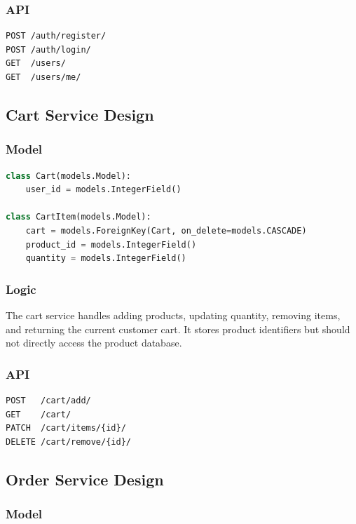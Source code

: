 \documentclass[12pt,a4paper]{article}
\begin{document}
\subsubsection{API}

\begin{lstlisting}[caption={User service API.}]
POST /auth/register/
POST /auth/login/
GET  /users/
GET  /users/me/
\end{lstlisting}

\subsection{Cart Service Design}

\subsubsection{Model}

\begin{lstlisting}[language=Python,caption={Cart service model.}]
class Cart(models.Model):
    user_id = models.IntegerField()

class CartItem(models.Model):
    cart = models.ForeignKey(Cart, on_delete=models.CASCADE)
    product_id = models.IntegerField()
    quantity = models.IntegerField()
\end{lstlisting}

\subsubsection{Logic}

The cart service handles adding products, updating quantity, removing items, and returning the current customer cart. It stores product identifiers but should not directly access the product database.

\subsubsection{API}

\begin{lstlisting}[caption={Cart service API.}]
POST   /cart/add/
GET    /cart/
PATCH  /cart/items/{id}/
DELETE /cart/remove/{id}/
\end{lstlisting}

\subsection{Order Service Design}

\subsubsection{Model}
\end{document}
